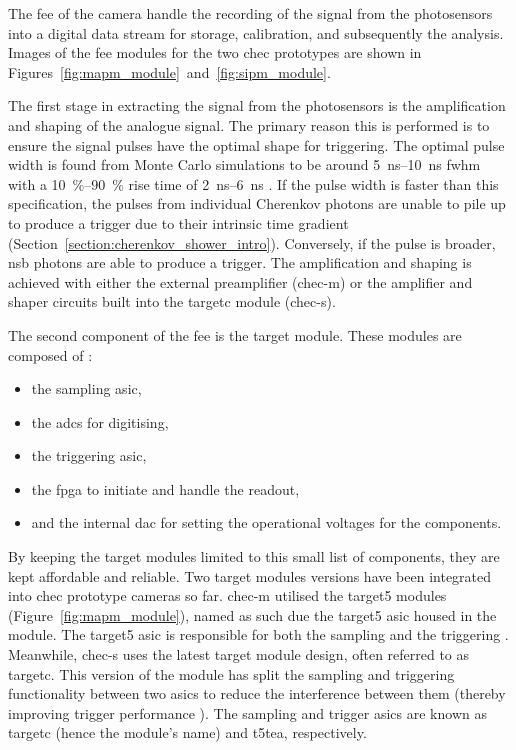 The \gls{fee} of the camera handle the recording of the signal from the photosensors into a digital data stream for storage, calibration, and subsequently the analysis. Images of the \gls{fee} modules for the two \gls{chec} prototypes are shown in Figures~\ref{fig:mapm_module}~and~\ref{fig:sipm_module}.

The first stage in extracting the signal from the photosensors is the amplification and shaping of the analogue signal. The primary reason this is performed is to ensure the signal pulses have the optimal shape for triggering. The optimal pulse width is found from Monte Carlo simulations to be around \SIrange{5}{10}{ns} \gls{fwhm} with a \SIrange{10}{90}{\percent} rise time of \SIrange{2}{6}{ns} \cite{Zorn2017}. If the pulse width is faster than this specification, the pulses from individual Cherenkov photons are unable to pile up to produce a trigger due to their intrinsic time gradient (Section~\ref{section:cherenkov_shower_intro}). Conversely, if the pulse is broader, \gls{nsb} photons are able to produce a trigger. The amplification and shaping is achieved with either the external preamplifier (\gls{chec-m}) or the amplifier and shaper circuits built into the \gls{targetc} module (\gls{chec-s}).

The second component of the \gls{fee} is the \gls{target} module. These modules are composed of \cite{Funk2017}: 
\begin{itemize}
\item the sampling \gls{asic},
\item the \glspl{adc} for digitising,
\item the triggering \gls{asic},
\item the \gls{fpga} to initiate and handle the readout,
\item and the internal \gls{dac} for setting the operational voltages for the components.
\end{itemize}
By keeping the \gls{target} modules limited to this small list of components, they are kept affordable and reliable. Two \gls{target} modules versions have been integrated into \gls{chec} prototype cameras so far. \gls{chec-m} utilised the \gls{target5} modules (Figure~\ref{fig:mapm_module}), named as such due the \gls{target5} \gls{asic} housed in the module. The \gls{target5} \gls{asic} is responsible for both the sampling and the triggering \cite{Albert2017}. Meanwhile, \gls{chec-s} uses the latest \gls{target} module design, often referred to as \gls{targetc}. This version of the module has split the sampling and triggering functionality between two \glspl{asic} to reduce the interference between them (thereby improving trigger performance \cite{Funk2017}). The sampling and trigger \glspl{asic} are known as \gls{targetc} (hence the module's name) and \gls{t5tea}, respectively.

